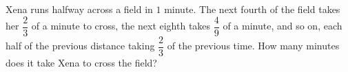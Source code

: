 Xena runs halfway across a field in $1$ minute. The next fourth of the field takes her $\dfrac{2}{3}$ of a minute to cross, the next eighth takes $\dfrac{4}{9}$ of a minute, and so on, each half of the previous distance taking $\dfrac{2}{3}$ of the previous time. How many minutes does it take Xena to cross the field?
